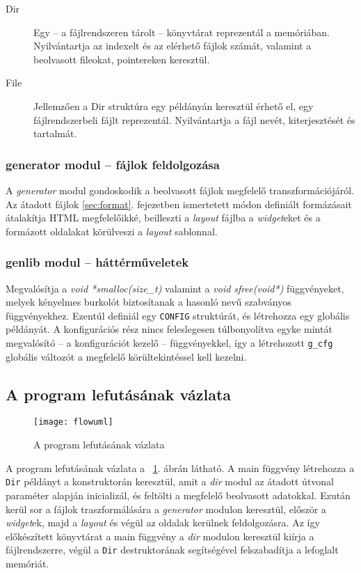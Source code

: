 \documentclass[a4paper,10pt]{article}
\begin{document}
\begin{description}
	\item[Dir] Egy -- a fájlrendszeren tárolt -- könyvtárat reprezentál a memóriában. Nyilvántartja az indexelt és az elérhető fájlok számát, valamint a beolvasott fileokat, pointereken keresztül.
	\item[File] Jellemzően a Dir struktúra egy példányán keresztül érhető el, egy fájlrendszerbeli fájlt reprezentál. Nyilvántartja a fájl nevét, kiterjesztését és tartalmát.
\end{description}

\subsubsection{generator modul -- fájlok feldolgozása}
A \emph{generator} modul gondoskodik a beolvasott fájlok megfelelő transzformációjáról. Az átadott fájlok \ref{sec:format}. fejezetben ismertetett módon definiált formázásait átalakítja HTML megfelelőikké, beilleszti a \emph{layout} fájlba a \emph{widget}eket és a formázott oldalakat körülveszi a \emph{layout} sablonnal.

\subsubsection{genlib modul -- háttérműveletek}
Megvalósítja a \emph{void *smalloc(size\_t)} valamint a \emph{void sfree(void*)} függvényeket, melyek kényelmes burkolót biztosítanak a hasonló nevű szabványos függvényekhez. Ezentúl definiál egy \texttt{CONFIG} struktúrát, és létrehozza egy globális példányát. A konfigurációs rész nincs feleslegesen túlbonyolítva egyke mintát megvalósító -- a konfigurációt kezelő -- függvényekkel, így a létrehozott \texttt{g\_cfg} globális változót a megfelelő körültekintéssel kell kezelni.

\subsection{A program lefutásának vázlata}

\begin{figure}[h]
	\begin{center}
		\texttt{[image: flowuml]}
		\caption{A program lefutásának vázlata}
		\label{fig:flow}
	\end{center}
\end{figure}

A program lefutásának vázlata a ~\ref{fig:flow}. ábrán látható. A main függvény létrehozza a \texttt{Dir} példányt a konstruktorán keresztül, amit a \emph{dir} modul az átadott útvonal paraméter alapján inicializál, és feltölti a megfelelő beolvasott adatokkal.
Ezután kerül sor a fájlok traszformálására a \emph{generator} modulon keresztül, először a \emph{widget}ek, majd a \emph{layout} és végül az oldalak kerülnek feldolgozásra.
Az így előkészített könyvtárat a main függvény a \emph{dir} modulon keresztül kiírja a fájlrendszerre, végül a \texttt{Dir} destruktorának segítségével felszabadítja a lefoglalt memóriát.
\end{document}
